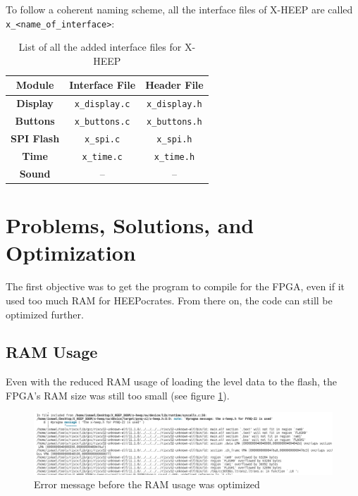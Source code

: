 To follow a coherent naming scheme, all the interface files of X-HEEP are called \texttt{x\_<name\_of\_interface>}: \\
\begin{table}[ht]
\centering
\begin{tabular}{|c|c|c|}
\hline
\textbf{Module} & \textbf{Interface File} & \textbf{Header File} \\
\hline
\textbf{Display} & \texttt{x\_display.c} & \texttt{x\_display.h} \\
\hline
\textbf{Buttons} & \texttt{x\_buttons.c} & \texttt{x\_buttons.h} \\
\hline
\textbf{SPI Flash} & \texttt{x\_spi.c} & \texttt{x\_spi.h} \\
\hline
\textbf{Time} & \texttt{x\_time.c} & \texttt{x\_time.h} \\
\hline
\textbf{Sound} & -- & -- \\
\hline
\end{tabular}
\caption{List of all the added interface files for X-HEEP}
\label{table:interfaceFiles}
\end{table}


\section{Problems, Solutions, and Optimization}

The first objective was to get the program to compile for the FPGA, even if it used too much RAM for HEEPocrates. From there on, the code can still be optimized further.

\subsection{RAM Usage}

Even with the reduced RAM usage of loading the level data to the flash, the FPGA's RAM size was still too small (see figure \ref{fig:ramOverflowError}). \\


\begin{figure}[ht]
    \centering
    \includegraphics[width=\textwidth]{images/ramOverflowError.png}
    \caption{Error message before the RAM usage was optimized}
    \label{fig:ramOverflowError}
\end{figure}

